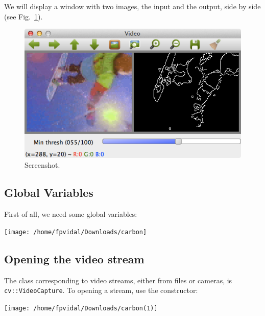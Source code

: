 \documentclass[english,a4paper,12pt,oneside]{article}
\begin{document}
We will display a window with two images, the input and the output, side by side (see Fig.~\ref{fig:screenshot}).
 \begin{figure}[htbp]
  \centering
  \includegraphics[width=0.7\linewidth]{screenshot1}
  \caption{\label{fig:screenshot}Screenshot.}
 \end{figure}

 \newpage
\subsection{Global Variables}

First of all, we need some global variables:

\texttt{[image: /home/fpvidal/Downloads/carbon]}
% 
% 
% 
% 


 \newpage
\subsection{Opening the video stream}
\label{sec:param}

The class corresponding to video streams, either from files or cameras, is \verb+cv::VideoCapture+. 
To opening a stream, use the constructor:

\texttt{[image: /home/fpvidal/Downloads/carbon(1)]}
\end{document}
